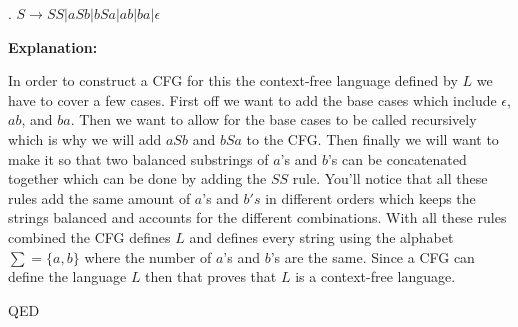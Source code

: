 \documentclass[11pt, letterpaper]{article}
\begin{document}
. $S \rightarrow SS|aSb|bSa|ab|ba|\epsilon$

\vspace{5mm}

\noindent\textbf{Explanation:}

\vspace{5mm}

\noindent In order to construct a CFG for this the context-free language defined by $L$ we have to cover a few cases. First off we want to add the base cases which include $\epsilon$, $ab$, and $ba$. Then we want to allow for the base cases to be called recursively which is why we will add $aSb$ and $bSa$ to the CFG. Then finally we will want to make it so that two balanced substrings of $a$'s and $b$'s can be concatenated together which can be done by adding the $SS$ rule. You'll notice that all these rules add the same amount of $a$'s and $b's$ in different orders which keeps the strings balanced and accounts for the different combinations. With all these rules combined the CFG defines $L$ and defines every string using the alphabet $\sum = \{a, b\}$ where the number of $a$'s and $b$'s are the same. Since a CFG can define the language $L$ then that proves that $L$ is a context-free language.

\vspace{5mm}

\noindent QED
\end{document}
